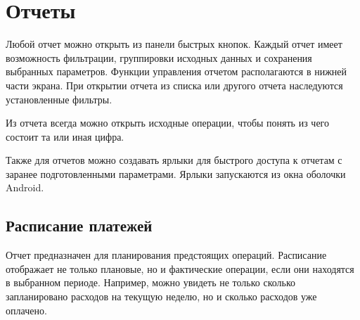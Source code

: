 \documentclass[a4paper,10pt,russian]{sphinxmanual}
\begin{document}
\sphinxstepscope


\chapter{Отчеты}
\label{\detokenize{reports:chapter-reports}}\label{\detokenize{reports:id1}}\label{\detokenize{reports::doc}}
\sphinxAtStartPar
Любой отчет можно открыть из панели быстрых кнопок. Каждый отчет имеет возможность фильтрации,
группировки исходных данных и сохранения выбранных параметров. Функции
управления отчетом располагаются в нижней части экрана. При открытии отчета из списка или
другого отчета наследуются установленные фильтры.

\noindent{}

\noindent{}

\noindent{}

\noindent{}

\noindent{}

\sphinxAtStartPar
Из отчета всегда можно открыть исходные операции, чтобы понять из чего состоит та или иная цифра.

\sphinxAtStartPar
Также для отчетов можно создавать ярлыки для быстрого доступа к отчетам с заранее подготовленными параметрами.
Ярлыки запускаются из окна оболочки Android.


\section{Расписание платежей}
\label{\detokenize{reports:id2}}
\sphinxAtStartPar
Отчет предназначен для планирования предстоящих операций. Расписание отображает не только плановые, но и фактические
операции, если они находятся в выбранном периоде. Например, можно увидеть не только сколько запланировано расходов
на текущую неделю, но и сколько расходов уже оплачено.

\noindent{}

\noindent{}

\noindent{}
\end{document}
